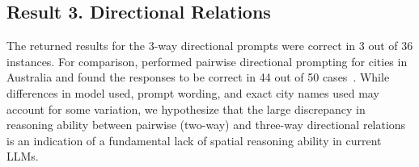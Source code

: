 {%
%         
%         
%         


\subsection{Result 3. Directional Relations}
The returned results for the 3-way directional prompts were correct in 3 out of 36 instances.
For comparison, \citeauthor{Qi2023} performed pairwise directional prompting for cities in Australia and found the responses to be correct in 44 out of 50 cases~\cite{Qi2023}.
While differences in model used, prompt wording, and exact city names used may account for some variation, we hypothesize that the large discrepancy in reasoning ability between pairwise (two-way) and three-way directional relations is an indication of a fundamental lack of spatial reasoning ability in current LLMs.





}
